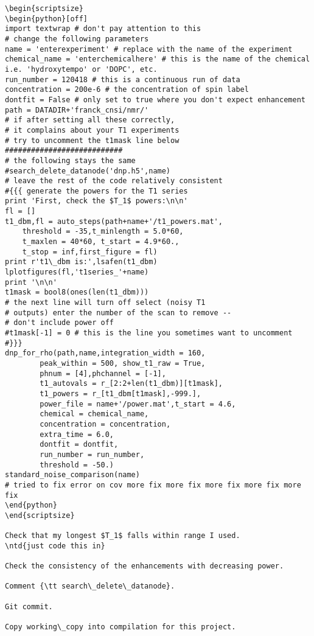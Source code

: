 \begin{scriptsize}
\begin{python}[off]
\begin{scriptsize}
\begin{lstlisting}
\begin{scriptsize}
\begin{python}[off]
import textwrap # don't pay attention to this
# change the following parameters
name = 'enterexperiment' # replace with the name of the experiment
chemical_name = 'enterchemicalhere' # this is the name of the chemical i.e. 'hydroxytempo' or 'DOPC', etc.
run_number = 120418 # this is a continuous run of data
concentration = 200e-6 # the concentration of spin label
dontfit = False # only set to true where you don't expect enhancement
path = DATADIR+'franck_cnsi/nmr/'
# if after setting all these correctly,
# it complains about your T1 experiments
# try to uncomment the t1mask line below
###########################
# the following stays the same
#search_delete_datanode('dnp.h5',name)
# leave the rest of the code relatively consistent
#{{{ generate the powers for the T1 series
print 'First, check the $T_1$ powers:\n\n'
fl = []
t1_dbm,fl = auto_steps(path+name+'/t1_powers.mat',
    threshold = -35,t_minlength = 5.0*60,
    t_maxlen = 40*60, t_start = 4.9*60.,
    t_stop = inf,first_figure = fl)
print r't1\_dbm is:',lsafen(t1_dbm)
lplotfigures(fl,'t1series_'+name)
print '\n\n'
t1mask = bool8(ones(len(t1_dbm)))
# the next line will turn off select (noisy T1
# outputs) enter the number of the scan to remove --
# don't include power off
#t1mask[-1] = 0 # this is the line you sometimes want to uncomment
#}}}
dnp_for_rho(path,name,integration_width = 160,
        peak_within = 500, show_t1_raw = True,
        phnum = [4],phchannel = [-1],
        t1_autovals = r_[2:2+len(t1_dbm)][t1mask],
        t1_powers = r_[t1_dbm[t1mask],-999.],
        power_file = name+'/power.mat',t_start = 4.6,
        chemical = chemical_name,
        concentration = concentration,
        extra_time = 6.0,
        dontfit = dontfit,
        run_number = run_number,
        threshold = -50.)
standard_noise_comparison(name)
# tried to fix error on cov more fix more fix more fix more fix more fix
\end{python}
\end{scriptsize}

Check that my longest $T_1$ falls within range I used.
\ntd{just code this in}

Check the consistency of the enhancements with decreasing power.

Comment {\tt search\_delete\_datanode}.

Git commit.

Copy working\_copy into compilation for this project.


\end{lstlisting}
\end{scriptsize}
\end{python}
\end{scriptsize}

